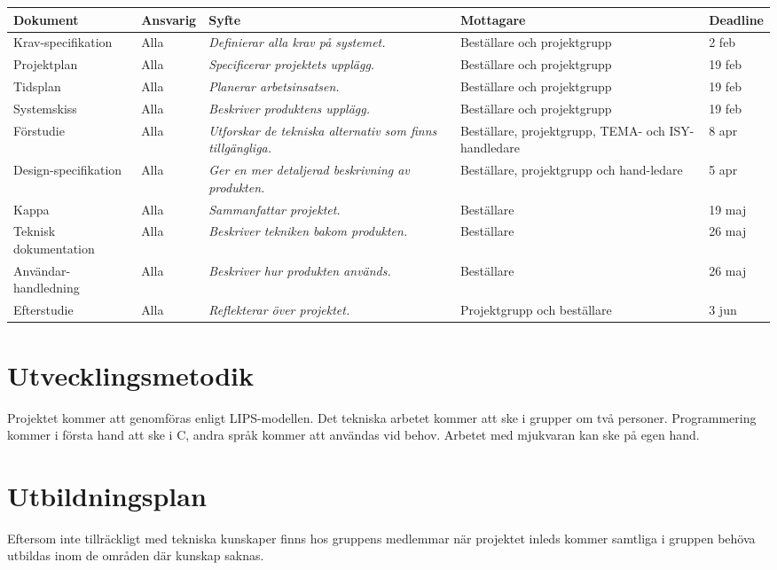 \documentclass[11pt]{article}
\begin{document}
\begin{flushleft}
\begin{longtable}{| p{.17\linewidth} | p{.11\linewidth} | p{.31\linewidth} | p{.15\linewidth} | p{.11\linewidth} |} \hline
\textbf{Dokument} & \textbf{Ansvarig} & \textbf{Syfte} & \textbf{Mottagare} & \textbf{Deadline} \\ \hline
Krav-specifikation & Alla & \textit{Definierar alla krav på systemet.} & Beställare och projektgrupp & 2 feb \\ \hline
Projektplan & Alla & \textit{Specificerar projektets upplägg.} & Beställare och projektgrupp & 19 feb \\ \hline
Tidsplan & Alla & \textit{Planerar arbetsinsatsen.} & Beställare och projektgrupp & 19 feb \\ \hline
Systemskiss & Alla & \textit{Beskriver produktens upplägg.} & Beställare och projektgrupp & 19 feb \\ \hline
Förstudie & Alla & \textit{Utforskar de tekniska alternativ som finns tillgängliga.} & Beställare, projektgrupp, TEMA- och ISY-handledare & 8 apr \\ \hline
Design-specifikation & Alla & \textit{Ger en mer detaljerad beskrivning av produkten.} & Beställare, projektgrupp och hand-ledare & 5 apr \\ \hline
Kappa & Alla & \textit{Sammanfattar projektet.} & Beställare & 19 maj \\ \hline
Teknisk \mbox{dokumentation} & Alla & \textit{Beskriver tekniken bakom produkten.} & Beställare & 26 maj\\ \hline
Användar-handledning & Alla & \textit{Beskriver hur produkten används.} & Beställare & 26 maj \\ \hline
Efterstudie & Alla & \textit{Reflekterar över projektet.} & Projektgrupp och beställare & 3 jun \\ \hline

\end{longtable}

\pagebreak
\section{Utvecklingsmetodik}
Projektet kommer att genomföras enligt LIPS-modellen. Det tekniska arbetet kommer att ske i grupper om två personer. Programmering kommer i första hand att ske i C, andra språk kommer att användas vid behov. Arbetet med mjukvaran kan ske på egen hand.

\section{Utbildningsplan}
Eftersom inte tillräckligt med tekniska kunskaper finns hos gruppens medlemmar när projektet inleds kommer samtliga i gruppen behöva utbildas inom de områden där kunskap saknas. 

\end{flushleft}
\end{document}
